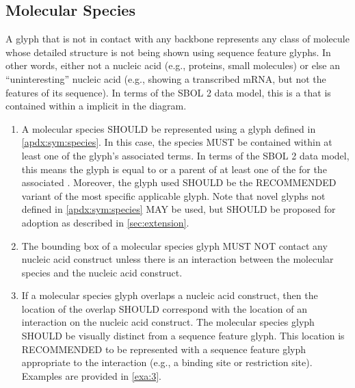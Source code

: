 \subsection{Molecular Species}


A glyph that is not in contact with any backbone represents any class of molecule whose detailed structure is not being shown using sequence feature glyphs.
In other words, either not a nucleic acid (e.g., proteins, small molecules) or else an ``uninteresting'' nucleic acid (e.g., showing a transcribed mRNA, but not the features of its sequence).
In terms of the SBOL 2 data model, this is a  that is contained within a  implicit in the diagram.

\begin{enumerate}
\item A molecular species SHOULD be represented using a glyph defined in \ref{apdx:sym:species}.  In this case, the species MUST be contained within at least one of the glyph's associated terms.
In terms of the SBOL 2 data model, this means the glyph is equal to or a parent of at least one of the  for the associated .
	Moreover, the glyph used SHOULD be the RECOMMENDED variant of the most specific applicable glyph.  Note that novel glyphs not defined in \ref{apdx:sym:species} MAY be used, but SHOULD be proposed for adoption as described in \ref{sec:extension}.
	
\item The bounding box of a molecular species glyph MUST NOT contact any nucleic acid construct unless there is an interaction between the molecular species and the nucleic acid construct.  

\item If a molecular species glyph overlaps a nucleic acid construct, then the location of the overlap SHOULD correspond with the location of an interaction on the nucleic acid construct.
	The molecular species glyph SHOULD be visually distinct from a sequence feature glyph.
	This location is RECOMMENDED to be represented with a sequence feature glyph appropriate to the interaction (e.g., a binding site or restriction site). 
	Examples are provided in \ref{exa:3}.


\end{enumerate}
